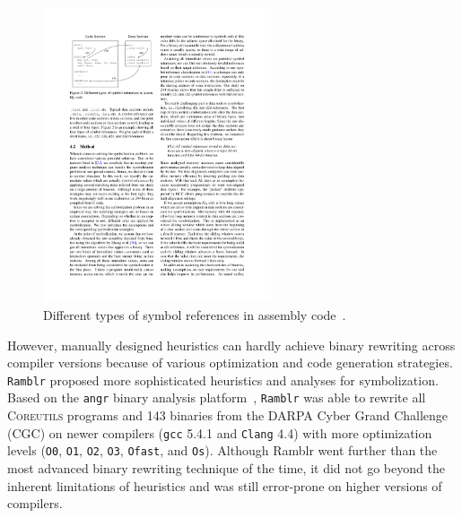 \begin{figure}[tb]
  \centering
  \includegraphics[width=0.6\textwidth]{fig/uroboros.pdf}
  \caption{Different types of symbol references in assembly code~\cite{wang2015reassembleable}.}
  \label{fig:uroboros}
\end{figure}

However, manually designed heuristics can hardly achieve binary rewriting across compiler versions because of various optimization and code generation strategies.
\texttt{Ramblr} proposed more sophisticated heuristics and analyses for symbolization. Based on the \texttt{angr} binary analysis platform~\cite{shoshitaishvili2016sok}, \texttt{Ramblr} was able to rewrite all \textsc{Coreutils} programs and 143 binaries from the DARPA Cyber Grand Challenge (CGC) on newer compilers (\texttt{gcc} 5.4.1 and \texttt{Clang} 4.4) with more optimization levels (\texttt{O0}, \texttt{O1}, \texttt{O2}, \texttt{O3}, \texttt{Ofast}, and \texttt{Os}). Although Ramblr went further than the most advanced binary rewriting technique of the time, it did not go beyond the inherent limitations of heuristics and was still error-prone on higher versions of compilers.

